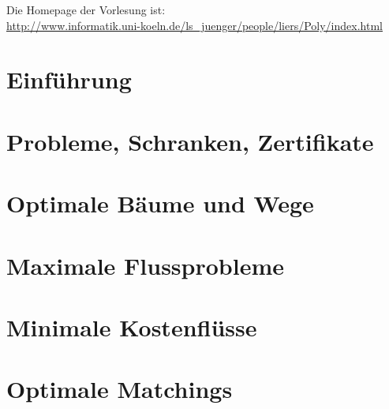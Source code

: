 \documentclass[12pt,titlepage,a4paper] {book}
\begin{document}
Die Homepage der Vorlesung ist:\\
\url{
http://www.informatik.uni-koeln.de/ls_juenger/people/liers/Poly/index.html}


\ifpdf
{}%
\fi
\begin{onehalfspacing}
\tableofcontents
\end{onehalfspacing}
\pagebreak
{}



\setcounter{chapter}{-1}

\newtheorem{satz}{Satz}[chapter]
\newtheorem{lemma}[satz]{Lemma}
\newtheorem{korollar}[satz]{Korollar}


\chapter{Einführung}

{}

\chapter{Probleme, Schranken, Zertifikate}

{}


\chapter{Optimale Bäume und Wege}


{}

\chapter{Maximale Flussprobleme}

{}

\chapter{Minimale Kostenflüsse}

{}

\chapter{Optimale Matchings}

{}
\end{document}
